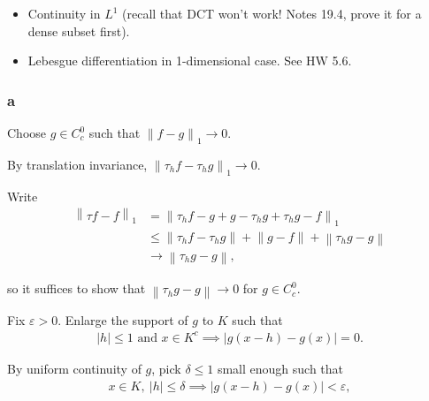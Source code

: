 \begin{solution}

\hfill

\begin{concept}

\hfill

\begin{itemize}
\tightlist
\item
  Continuity in \(L^1\) (recall that DCT won't work! Notes 19.4, prove
  it for a dense subset first).
\item
  Lebesgue differentiation in 1-dimensional case. See HW 5.6.
\end{itemize}

\end{concept}

\hypertarget{a-10}{%
\subsubsection{a}\label{a-10}}

Choose \(g\in C_c^0\) such that
\({\left\lVert {f- g} \right\rVert}_1 \to 0\).

By translation invariance,
\({\left\lVert {\tau_h f - \tau_h g} \right\rVert}_1 \to 0\).

Write
\begin{align*}
{\left\lVert {\tau f - f} \right\rVert}_1 
&= {\left\lVert {\tau_h f - g + g - \tau_h g + \tau_h g - f} \right\rVert}_1 \\
&\leq {\left\lVert {\tau_h f - \tau_h g} \right\rVert} + {\left\lVert {g - f} \right\rVert} + {\left\lVert {\tau_h g - g} \right\rVert} \\
&\to {\left\lVert {\tau_h g - g} \right\rVert}
,\end{align*}

so it suffices to show that
\({\left\lVert {\tau_h g - g} \right\rVert} \to 0\) for \(g\in C_c^0\).

Fix \(\varepsilon > 0\). Enlarge the support of \(g\) to \(K\) such that
\begin{align*}
{\left\lvert {h} \right\rvert} \leq 1 \text{ and } x \in K^c \implies {\left\lvert {g(x-h) - g(x)} \right\rvert} = 0
.\end{align*}

By uniform continuity of \(g\), pick \(\delta \leq 1\) small enough such
that
\begin{align*}
x\in K, ~{\left\lvert {h} \right\rvert} \leq \delta \implies {\left\lvert {g(x-h) -g(x)} \right\rvert} < \varepsilon
,\end{align*}


\end{solution}
